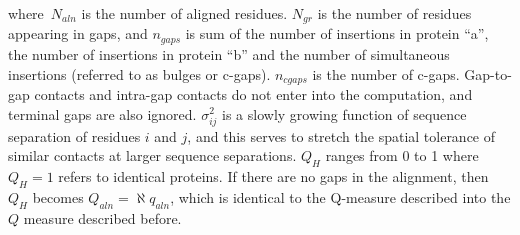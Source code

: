 where~\( N_{aln} \) is the number of aligned residues. \( N_{gr} \) is
the number of residues appearing in gaps, and \( n_{gaps} \) is sum of
the number of insertions in protein ``a'', the number of insertions in
protein ``b'' and the number of simultaneous insertions (referred to as
bulges or c-gaps). \( n_{cgaps} \) is the number of c-gaps. Gap-to-gap
contacts and intra-gap contacts do not enter into the computation, and
terminal gaps are also ignored. \( \sigma ^{2}_{ij} \) is a slowly
growing function of sequence separation of residues \( i \) and \( j \),
and this serves to stretch the spatial tolerance of similar contacts at
larger sequence separations. \(Q_{H}\) ranges from 0 to 1 where
\(Q_{H}=1\) refers to identical proteins. If there are no gaps in the
alignment, then \( Q_{H} \) becomes \( Q_{aln}=\aleph q_{aln}\), which
is identical to the Q-measure described into the $Q$ measure described
before.

